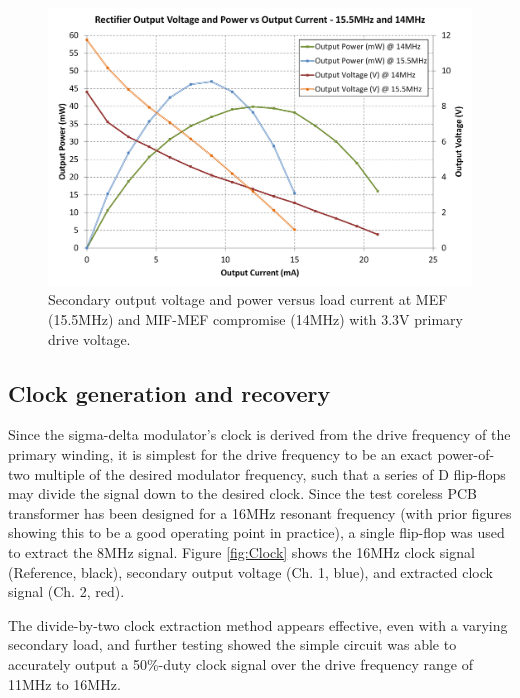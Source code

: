 \documentclass[conference]{IEEEtran}
\begin{document}
	\begin{figure}[t]
		\centering
		\includegraphics[width=1\columnwidth]{./img/VandPvsIcombined}
		\caption{Secondary output voltage and power versus load current at MEF (15.5MHz) and MIF-MEF compromise (14MHz) with 3.3V primary drive voltage.}
		\label{fig:VandPvsI}
	\end{figure}
	
	\subsection{Clock generation and recovery}
	Since the sigma-delta modulator's clock is derived from the drive frequency of the primary winding, it is simplest for the drive frequency to be an exact power-of-two multiple of the desired modulator frequency, such that a series of D flip-flops may divide the signal down to the desired clock.  Since the test coreless PCB transformer has been designed for a 16MHz resonant frequency (with prior figures showing this to be a good operating point in practice), a single flip-flop was used to extract the 8MHz signal.  Figure \ref{fig:Clock} shows the 16MHz clock signal (Reference, black), secondary output voltage (Ch. 1, blue), and extracted clock signal (Ch. 2, red).  
	
	The divide-by-two clock extraction method appears effective, even with a varying secondary load, and further testing showed the simple circuit was able to accurately output a 50\%-duty clock signal over the drive frequency range of 11MHz to 16MHz.
	
\end{document}
